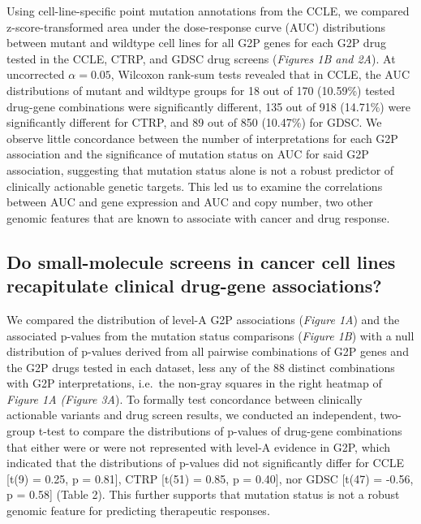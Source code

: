 \documentclass[man]{apa6}
\begin{document}
Using cell-line-specific point mutation annotations from the CCLE, we
compared z-score-transformed area under the dose-response curve (AUC)
distributions between mutant and wildtype cell lines for all G2P genes
for each G2P drug tested in the CCLE, CTRP, and GDSC drug screens
(\emph{Figures 1B and 2A}). At uncorrected \(\alpha = 0.05\), Wilcoxon
rank-sum tests revealed that in CCLE, the AUC distributions of mutant
and wildtype groups for 18 out of 170 (10.59\%) tested drug-gene
combinations were significantly different, 135 out of 918 (14.71\%) were
significantly different for CTRP, and 89 out of 850 (10.47\%) for GDSC.
We observe little concordance between the number of interpretations for
each G2P association and the significance of mutation status on AUC for
said G2P association, suggesting that mutation status alone is not a
robust predictor of clinically actionable genetic targets. This led us
to examine the correlations between AUC and gene expression and AUC and
copy number, two other genomic features that are known to associate with
cancer and drug response.

\subsection{Do small-molecule screens in cancer cell lines recapitulate
clinical drug-gene
associations?}\label{do-small-molecule-screens-in-cancer-cell-lines-recapitulate-clinical-drug-gene-associations}

We compared the distribution of level-A G2P associations (\emph{Figure
1A}) and the associated p-values from the mutation status comparisons
(\emph{Figure 1B}) with a null distribution of p-values derived from all
pairwise combinations of G2P genes and the G2P drugs tested in each
dataset, less any of the 88 distinct combinations with G2P
interpretations, i.e.~the non-gray squares in the right heatmap of
\emph{Figure 1A (Figure 3A}). To formally test concordance between
clinically actionable variants and drug screen results, we conducted an
independent, two-group t-test to compare the distributions of p-values
of drug-gene combinations that either were or were not represented with
level-A evidence in G2P, which indicated that the distributions of
p-values did not significantly differ for CCLE {[}t(9) = 0.25, p =
0.81{]}, CTRP {[}t(51) = 0.85, p = 0.40{]}, nor GDSC {[}t(47) = -0.56, p
= 0.58{]} (Table 2). This further supports that mutation status is not a
robust genomic feature for predicting therapeutic responses.
\end{document}
